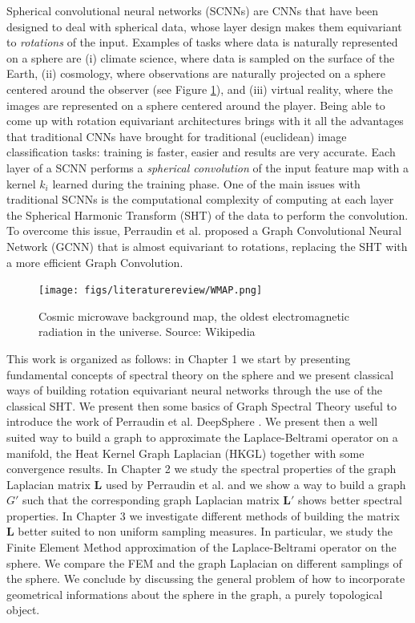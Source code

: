 Spherical convolutional neural networks (SCNNs) are CNNs that have been designed to deal with spherical data, whose layer design makes them equivariant to \textit{rotations} of the input.  Examples of tasks where data is naturally represented on a sphere are (i) climate science, where data is sampled on the surface of the Earth, (ii) cosmology, where observations are naturally projected on a sphere centered around the observer (see Figure \ref{fig:cosmicradiation}), and (iii) virtual reality, where the images are represented on a sphere centered around the player. Being able to come up with rotation equivariant architectures brings with it all the advantages that traditional CNNs have brought for traditional (euclidean) image classification tasks: training is faster, easier and results are very accurate. Each layer of a SCNN performs a \textit{spherical convolution} of the input feature map with a kernel $k_i$ learned during the training phase. One of the main issues with traditional SCNNs is the computational complexity of computing at each layer the Spherical Harmonic Transform (SHT) of the data to perform the convolution. To overcome this issue, Perraudin et al. \cite{DeepSphere} proposed a Graph Convolutional Neural Network (GCNN) that is almost equivariant to rotations, replacing the SHT with a more efficient Graph Convolution.
\begin{figure}
	\centering
	\caption{\label{fig:cosmicradiation} Cosmic microwave background map, the oldest electromagnetic radiation in the universe. Source: Wikipedia}
	\texttt{[image: figs/literaturereview/WMAP.png]}
\end{figure}

This work is organized as follows: in Chapter 1 we start by presenting fundamental concepts of spectral theory on the sphere and we present classical ways of building rotation equivariant neural networks through the use of the classical SHT.  We present then some basics of Graph Spectral Theory useful to introduce the work of Perraudin et al. DeepSphere \cite{DeepSphere}. We present then a well suited way to build a graph to approximate the Laplace-Beltrami operator on a manifold, the Heat Kernel Graph Laplacian (HKGL) together with some convergence results. In Chapter 2 we study the spectral properties of the graph Laplacian matrix $\mathbf L$ used by Perraudin et al. and we show a way to build a graph $G'$ such that the corresponding graph Laplacian matrix $\mathbf L'$ shows better spectral properties. In Chapter 3 we investigate different methods of building the matrix $\mathbf L$ better suited to non uniform sampling measures. In particular, we study the Finite Element Method approximation of the Laplace-Beltrami operator on the sphere. We compare the FEM and the graph Laplacian on different samplings of the sphere. We conclude by discussing the general problem of how to incorporate geometrical informations about the sphere in the graph, a purely topological object.

